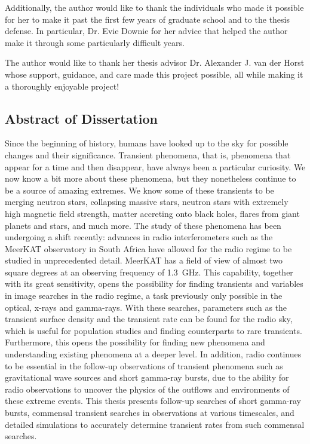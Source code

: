 \documentclass[12pt]{article}
\begin{document}
Additionally, the author would like to thank the individuals who made it possible for her to make it past the first few years of graduate school and to the thesis defense. In particular, Dr. Evie Downie for her advice that helped the author make it through some particularly difficult years. 

The author would like to thank her thesis advisor Dr. Alexander J. van der Horst whose support, guidance, and care made this project possible, all while making it a thoroughly enjoyable project! 
\newpage
\begin{center}
\section*{Abstract of Dissertation}
\end{center}
 \label{abstract}
\vspace*{-40pt}
\vspace{24pt}
\begin{singlespace}
\end{singlespace}
\vspace{-12pt}
\vspace*{24pt}
Since the beginning of history, humans have looked up to the sky for possible changes and their significance. Transient phenomena, that is, phenomena that appear for a time and then disappear, have always been a particular curiosity. We now know a bit more about these phenomena, but they nonetheless continue to be a source of amazing extremes. We know some of these transients to be merging neutron stars, collapsing massive stars, neutron stars with extremely high magnetic field strength, matter accreting onto black holes, flares from giant planets and stars, and much more. The study of these phenomena has been undergoing a shift recently: advances in radio interferometers such as the MeerKAT observatory in South Africa have allowed for the radio regime to be studied in unprecedented detail. MeerKAT has a field of view of almost two square degrees at an observing frequency of 1.3~GHz. This capability, together with its great sensitivity, opens the possibility for finding transients and variables in image searches in the radio regime, a task previously only possible in the optical, x-rays and gamma-rays. With these searches, parameters such as the transient surface density and the transient rate can be found for the radio sky, which is useful for population studies and finding counterparts to rare transients. Furthermore, this opens the possibility for finding new phenomena and understanding existing phenomena at a deeper level. In addition, radio continues to be essential in the follow-up observations of transient phenomena such as gravitational wave sources and short gamma-ray bursts, due to the ability for radio observations to uncover the physics of the outflows and environments of these extreme events. This thesis presents follow-up searches of short gamma-ray bursts, commensal transient searches in observations at various timescales, and detailed simulations to accurately determine transient rates from such commensal searches.
\end{document}
